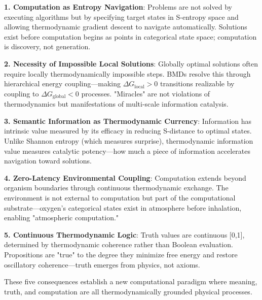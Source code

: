 \textbf{1. Computation as Entropy Navigation}: Problems are not solved by executing algorithms but by specifying target states in S-entropy space and allowing thermodynamic gradient descent to navigate automatically. Solutions exist before computation begins as points in categorical state space; computation is discovery, not generation.

\textbf{2. Necessity of Impossible Local Solutions}: Globally optimal solutions often require locally thermodynamically impossible steps. BMDs resolve this through hierarchical energy coupling—making $\Delta G_{\text{local}} > 0$ transitions realizable by coupling to $\Delta G_{\text{global}} < 0$ processes. "Miracles" are not violations of thermodynamics but manifestations of multi-scale information catalysis.

\textbf{3. Semantic Information as Thermodynamic Currency}: Information has intrinsic value measured by its efficacy in reducing S-distance to optimal states. Unlike Shannon entropy (which measures surprise), thermodynamic information value measures catalytic potency—how much a piece of information accelerates navigation toward solutions.

\textbf{4. Zero-Latency Environmental Coupling}: Computation extends beyond organism boundaries through continuous thermodynamic exchange. The environment is not external to computation but part of the computational substrate—oxygen's categorical states exist in atmosphere before inhalation, enabling "atmospheric computation."

\textbf{5. Continuous Thermodynamic Logic}: Truth values are continuous [0,1], determined by thermodynamic coherence rather than Boolean evaluation. Propositions are "true" to the degree they minimize free energy and restore oscillatory coherence—truth emerges from physics, not axioms.

These five consequences establish a new computational paradigm where meaning, truth, and computation are all thermodynamically grounded physical processes.

